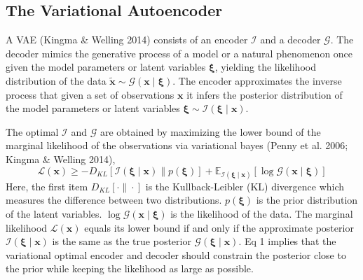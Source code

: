 \documentclass[10pt]{article}
\begin{document}
\subsection{The Variational Autoencoder}
A VAE (Kingma \& Welling 2014) consists of an encoder $\mathcal{I}$ and a decoder $\mathcal{G}$. The decoder mimics the generative process of a model or a natural phenomenon once given the model parameters or latent variables $\boldsymbol{\xi}$, yielding the likelihood distribution of the data $\tilde{\boldsymbol{x}} \sim \mathcal{G}(\boldsymbol{x} \mid \boldsymbol{\xi})$. The encoder approximates the inverse process that given a set of observations $\boldsymbol{x}$ it infers the posterior distribution of the model parameters or latent variables $\boldsymbol{\xi} \sim \mathcal{I}(\boldsymbol{\xi} \mid \boldsymbol{x})$.

The optimal $\mathcal{I}$ and $\mathcal{G}$ are obtained by maximizing the lower bound of the marginal likelihood of the observations via variational bayes (Penny et al. 2006; Kingma \& Welling 2014),
$$
\mathcal{L}(\boldsymbol{x}) \geq-D_{K L}[\mathcal{I}(\boldsymbol{\xi} \mid \boldsymbol{x}) \| p(\boldsymbol{\xi})]+\mathbb{E}_{\mathcal{I}(\boldsymbol{\xi} \mid \boldsymbol{x})}[\log \mathcal{G}(\boldsymbol{x} \mid \boldsymbol{\xi})]
$$
Here, the first item $D_{K L}[\cdot \| \cdot]$ is the Kullback-Leibler (KL) divergence which measures the difference between two distributions. $p(\boldsymbol{\xi})$ is the prior distribution of the latent variables. $\log \mathcal{G}(\boldsymbol{x} \mid \boldsymbol{\xi})$ is the likelihood of the data. The marginal likelihood $\mathcal{L}(\boldsymbol{x})$ equals its lower bound if and only if the approximate posterior $\mathcal{I}(\boldsymbol{\xi} \mid \boldsymbol{x})$ is the same as the true posterior $\mathcal{G}(\boldsymbol{\xi} \mid \boldsymbol{x}) .$ Eq 1 implies that the variational optimal encoder and decoder should constrain the posterior close to the prior while keeping the likelihood as large as possible.
\end{document}
